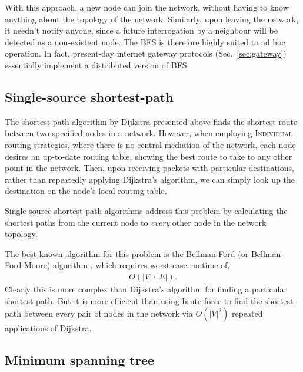 With this approach, a new node can join the network, without having to know anything about the topology of the network. Similarly, upon leaving the network, it needn't notify anyone, since a future interrogation by a neighbour will be detected as a non-existent node. The BFS is therefore highly suited to ad hoc operation. In fact, present-day internet gateway protocols (Sec.~\ref{sec:gateway}) essentially implement a distributed version of BFS.

%
%

\subsection{Single-source shortest-path} \label{sec:single_source_sp} 

The shortest-path algorithm by Dijkstra presented above finds the shortest route between two specified nodes in a network. However, when employing \textsc{Individual} routing strategies, where there is no central mediation of the network, each node desires an up-to-date routing table, showing the best route to take to any other point in the network. Then, upon receiving packets with particular destinations, rather than repeatedly applying Dijkstra's algorithm, we can simply look up the destination on the node's local routing table.

Single-source shortest-path algorithms address this problem by calculating the shortest paths from the current node to \textit{every} other node in the network topology.

The best-known algorithm for this problem is the Bellman-Ford (or Bellman-Ford-Moore) algorithm \cite{BF}, which requires worst-case runtime of,
\begin{align}
	O(|V|\cdot |E|).
\end{align}
Clearly this is more complex than Dijkstra's algorithm for finding a particular shortest-path. But it is more efficient than using brute-force to find the shortest-path between every pair of nodes in the network via $O(|V|^2)$ repeated applications of Dijkstra.

%
%

\subsection{Minimum spanning tree} \label{sec:min_tree} 

